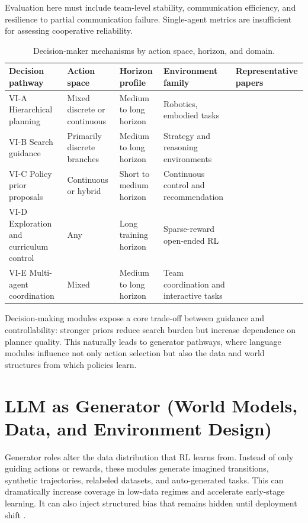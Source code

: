 \documentclass[pdflatex,sn-mathphys-num]{sn-jnl}
\begin{document}
Evaluation here must include team-level stability, communication efficiency, and resilience to partial communication failure. Single-agent metrics are insufficient for assessing cooperative reliability.

\begin{table}[t]
\centering
\small
\setlength{\tabcolsep}{4pt}
\begin{tabularx}{\textwidth}{P{2.2cm}P{1.9cm}P{2.3cm}P{2.4cm}Y}
\toprule
\textbf{Decision pathway} & \textbf{Action space} & \textbf{Horizon profile} & \textbf{Environment family} & \textbf{Representative papers}\\
\midrule
VI-A Hierarchical planning & Mixed discrete or continuous & Medium to long horizon & Robotics, embodied tasks & \cite{arxiv_p_2204_01691,arxiv_p_2305_16291,arxiv_p_2602_16165}\\
VI-B Search guidance & Primarily discrete branches & Medium to long horizon & Strategy and reasoning environments & \cite{arxiv_p_2602_07848,arxiv_p_2602_11551,doi_p_10_48448_q4pk_2g71}\\
VI-C Policy prior proposals & Continuous or hybrid & Short to medium horizon & Continuous control and recommendation & \cite{arxiv_p_2510_13229,arxiv_p_2602_06554,arxiv_p_2509_26093}\\
VI-D Exploration and curriculum control & Any & Long training horizon & Sparse-reward open-ended RL & \cite{arxiv_p_2512_16848,arxiv_p_2602_07906,arxiv_p_2601_16486}\\
VI-E Multi-agent coordination & Mixed & Medium to long horizon & Team coordination and interactive tasks & \cite{arxiv_p_2304_07297,arxiv_p_2602_08335,arxiv_p_2602_11583}\\
\bottomrule
\end{tabularx}
\caption{Decision-maker mechanisms by action space, horizon, and domain.}
\label{tab:t3_decision}
\end{table}

Decision-making modules expose a core trade-off between guidance and controllability: stronger priors reduce search burden but increase dependence on planner quality. This naturally leads to generator pathways, where language modules influence not only action selection but also the data and world structures from which policies learn.
\section{LLM as Generator (World Models, Data, and Environment Design)}
Generator roles alter the data distribution that RL learns from. Instead of only guiding actions or rewards, these modules generate imagined transitions, synthetic trajectories, relabeled datasets, and auto-generated tasks. This can dramatically increase coverage in low-data regimes and accelerate early-stage learning. It can also inject structured bias that remains hidden until deployment shift \cite{arxiv_p_2301_12050,arxiv_p_2602_02454,arxiv_p_2602_11075,arxiv_p_2310_20587,arxiv_p_2601_08107,arxiv_p_2512_24653,arxiv_p_2602_03305}.
\end{document}
